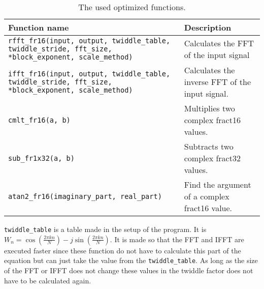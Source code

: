 \begin{table}
	\centering
	\begin{tabularx}{\textwidth}{X X}
		\toprule
		\textbf{Function name} & \textbf{Description }\\
		\midrule
		\texttt{rfft_fr16(input, output, twiddle_table, twiddle_stride, fft_size, *block_exponent, scale_method)} & Calculates the FFT of the input signal\\
		\texttt{ifft_fr16(input, output, twiddle_table, twiddle_stride, fft_size, *block_exponent, scale_method)} & Calculates the inverse FFT of the input signal. \\
		\texttt{cmlt_fr16(a, b)} & Multiplies two complex fract16 values. \\
		\texttt{sub_fr1x32(a, b)}& Subtracts two complex fract32 values. \\
		\texttt{atan2_fr16(imaginary_part, real_part)} & Find the argument of a complex fract16 value. \\
		\bottomrule
	\end{tabularx}
	\caption{The used optimized functions.}
	\label{tab:optimized_func}
\end{table}

\texttt{twiddle_table} is a table made in the setup of the program.
It is $W_n = \cos(\frac{2\pi kn}{N})-j\sin(\frac{2\pi kn}{N})$.
It is made so that the FFT and IFFT are executed faster since these function do not have to calculate this part of the equation but can just take the value from the \texttt{twiddle_table}.
As long as the size of the FFT or IFFT does not change these values in the twiddle factor does not have to be calculated again.

\FloatBarrier